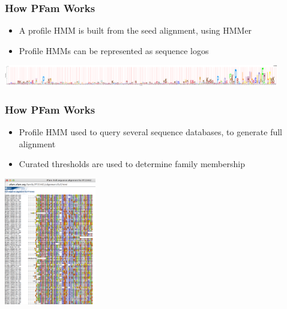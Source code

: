     \begin{frame}
      \frametitle{How PFam Works}   
      \begin{itemize}
        \item A profile HMM is built from the seed alignment, using HMMer
        \item Profile HMMs can be represented as sequence logos
      \end{itemize}
      \begin{center}
        \includegraphics[width=0.9\textwidth]{images/pfam2} 
      \end{center}      
    \end{frame}

    \begin{frame}
      \frametitle{How PFam Works}   
      \begin{itemize}
        \item Profile HMM used to query several sequence databases, to generate full alignment
        \item Curated thresholds are used to determine family membership
      \end{itemize}
      \begin{center}
        \includegraphics[width=0.3\textwidth]{images/pfam3} 
      \end{center}      
    \end{frame}

